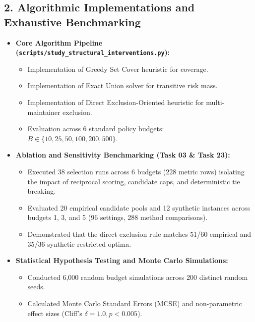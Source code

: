 \documentclass[11pt,a4paper]{article}
\begin{document}
\subsection{2. Algorithmic Implementations and Exhaustive Benchmarking}
\begin{itemize}
  \item \textbf{Core Algorithm Pipeline (\nolinkurl{scripts/study_structural_interventions.py}):}
  \begin{itemize}
    \item Implementation of Greedy Set Cover heuristic for coverage.
    \item Implementation of Exact Union solver for transitive risk mass.
    \item Implementation of Direct Exclusion-Oriented heuristic for multi-maintainer exclusion.
    \item Evaluation across 6 standard policy budgets: $B \in \{10, 25, 50, 100, 200, 500\}$.
  \end{itemize}
  \item \textbf{Ablation and Sensitivity Benchmarking (Task 03 \& Task 23):}
  \begin{itemize}
    \item Executed 38 selection runs across 6 budgets (228 metric rows) isolating the impact of reciprocal scoring, candidate caps, and deterministic tie breaking.
    \item Evaluated 20 empirical candidate pools and 12 synthetic instances across budgets 1, 3, and 5 (96 settings, 288 method comparisons).
    \item Demonstrated that the direct exclusion rule matches 51/60 empirical and 35/36 synthetic restricted optima.
  \end{itemize}
  \item \textbf{Statistical Hypothesis Testing and Monte Carlo Simulations:}
  \begin{itemize}
    \item Conducted 6,000 random budget simulations across 200 distinct random seeds.
    \item Calculated Monte Carlo Standard Errors (MCSE) and non-parametric effect sizes (Cliff's $\delta = 1.0, p < 0.005$).
  \end{itemize}
\end{itemize}
\end{document}
